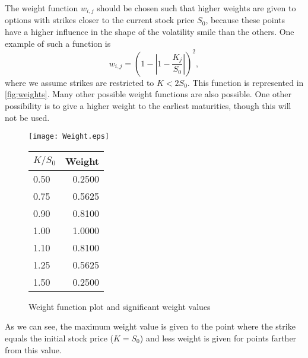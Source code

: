 The weight function $w_{i,j}$ should be chosen such that higher weights are given to options with strikes closer to the current stock price $S_0$, because these points have a higher influence in the shape of the volatility smile than the others.
One example of such a function is
\begin{equation}\label{weight}
w_{i,j}=\left(1-\left|1-\frac{K_j}{S_0}\right|\right)^2,
\end{equation}
\noindent where we assume strikes are restricted to $K<2S_0$.
This function is represented in \autoref{fig:weights}. Many other possible weight functions are also possible. One other possibility is to give a higher weight to the earliest maturities, though this will not be used.
    
\begin{figure}[!htb]
  \begin{minipage}[b]{0.65\linewidth}
    \centering
    \texttt{[image: Weight.eps]}
  \end{minipage}%
  \begin{minipage}[b]{0.30\linewidth}
    \centering
    \renewcommand{\arraystretch}{1.1}
\begin{tabular}{@{}lr@{}}
\toprule
$K/S_0$ & Weight \\ \midrule
0.50  & 0.2500 \\
0.75  & 0.5625 \\
0.90  & 0.8100 \\
1.00  & 1.0000 \\
1.10  & 0.8100 \\
1.25  & 0.5625 \\ 
1.50  & 0.2500 \\\bottomrule
\end{tabular}
    \vspace{5em}
  \end{minipage}
\caption[Weight function plot and significant weight values]{Weight function plot and significant weight values}\label{fig:weights}
\end{figure}    
    
\noindent As we can see, the maximum weight value is given to the point where the strike equals the initial stock price ($K=S_0$) and less weight is given for points farther from this value.

